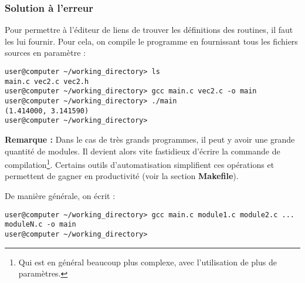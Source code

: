 \documentclass[../../../main.tex]{subfiles}
\begin{document}
\subsubsection{Solution à l'erreur}
Pour permettre à l'éditeur de liens de trouver les définitions des routines, il faut les lui fournir. Pour cela, on compile le programme en fournissant tous les fichiers sources en paramètre :
\begin{verbatim}
user@computer ~/working_directory> ls
main.c vec2.c vec2.h
user@computer ~/working_directory> gcc main.c vec2.c -o main
user@computer ~/working_directory> ./main
(1.414000, 3.141590)
user@computer ~/working_directory>
\end{verbatim}
\textbf{Remarque :} Dans le cas de très grands programmes, il peut y avoir une grande quantité de modules. Il devient alors vite fastidieux d'écrire la commande de compilation\footnote{Qui est en général beaucoup plus complexe, avec l'utilisation de plus de paramètres.}. Certains outils d'automatisation simplifient ces opérations et permettent de gagner en productivité (voir la section \textbf{Makefile}).
 
De manière générale, on écrit :
\begin{verbatim}
user@computer ~/working_directory> gcc main.c module1.c module2.c ... moduleN.c -o main
user@computer ~/working_directory>
\end{verbatim}
\end{document}
